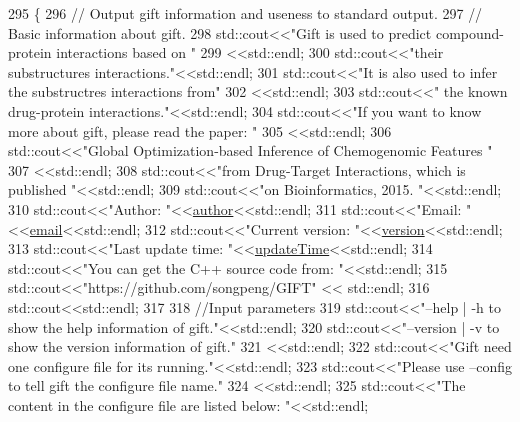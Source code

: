 \begin{DoxyCode}
295                 \{
296     \textcolor{comment}{// Output gift information and useness to standard output.}
297     \textcolor{comment}{// Basic information about gift.}
298     std::cout<<\textcolor{stringliteral}{"Gift is used to predict compound-protein interactions based on "}
299              <<std::endl;
300     std::cout<<\textcolor{stringliteral}{"their substructures interactions."}<<std::endl;
301     std::cout<<\textcolor{stringliteral}{"It is also used to infer the substructres interactions from"}
302              <<std::endl;
303     std::cout<<\textcolor{stringliteral}{" the known drug-protein interactions."}<<std::endl;
304     std::cout<<\textcolor{stringliteral}{"If you want to know more about gift, please read the paper: "}
305              <<std::endl;
306     std::cout<<\textcolor{stringliteral}{"Global Optimization-based Inference of Chemogenomic Features "}
307              <<std::endl;
308     std::cout<<\textcolor{stringliteral}{"from Drug-Target Interactions, which is published  "}<<std::endl;
309     std::cout<<\textcolor{stringliteral}{"on Bioinformatics, 2015. "}<<std::endl;
310     std::cout<<\textcolor{stringliteral}{"Author: "}<<\hyperlink{namespacegift_a808b6e0e19d275854aa787f2eac4df98}{author}<<std::endl;
311     std::cout<<\textcolor{stringliteral}{"Email: "} <<\hyperlink{namespacegift_aa24ca2be91b60d3c50d6848e87233a4c}{email}<<std::endl;
312     std::cout<<\textcolor{stringliteral}{"Current version: "}<<\hyperlink{namespacegift_a5a720324a7e112ad94437108be453df3}{version}<<std::endl;
313     std::cout<<\textcolor{stringliteral}{"Last update time: "}<<\hyperlink{namespacegift_a5de68828ba8a73f6e0de9f39d06aaa66}{updateTime}<<std::endl;
314     std::cout<<\textcolor{stringliteral}{"You can get the C++ source code from: "}<<std::endl;
315     std::cout<<\textcolor{stringliteral}{"https://github.com/songpeng/GIFT"} << std::endl;
316     std::cout<<std::endl;
317 
318     \textcolor{comment}{//Input parameters}
319     std::cout<<\textcolor{stringliteral}{"--help | -h to show the help information of gift."}<<std::endl;
320     std::cout<<\textcolor{stringliteral}{"--version | -v to show the version information of gift."}
321              <<std::endl;
322     std::cout<<\textcolor{stringliteral}{"Gift need one configure file for its running."}<<std::endl;
323     std::cout<<\textcolor{stringliteral}{"Please use --config to tell gift the configure file name."}
324              <<std::endl;
325     std::cout<<\textcolor{stringliteral}{"The content in the configure file are listed below: "}<<std::endl;

\end{DoxyCode}
